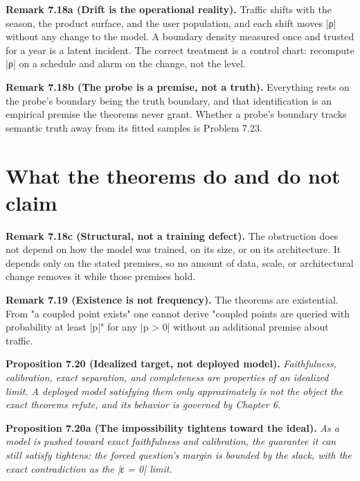 \documentclass{memoir}
\begin{document}
\textbf{Remark 7.18a (Drift is the operational reality).} Traffic shifts with the season, the
product surface, and the user population, and each shift moves \LeanVerb|ρ| without any
change to the model. A boundary density measured once and trusted for a year is
a latent incident. The correct treatment is a control chart: recompute \LeanVerb|ρ| on a
schedule and alarm on the change, not the level.

\textbf{Remark 7.18b (The probe is a premise, not a truth).} Everything rests on the probe's
boundary being the truth boundary, and that identification is an empirical
premise the theorems never grant. Whether a probe's boundary tracks semantic
truth away from its fitted samples is Problem 7.23.



\section{What the theorems do and do not claim}\label{Two--Schemas--of--Impossibility-005F-005F-005F--Machine--Checked--Limits--of--Trustworthy--Machine--Learning-005F-005F-005F--and--Why--They--Tighten--with--Capability----What--It--Means--for--AI--Safety----What--the--theorems--do--and--do--not--claim}

\textbf{Remark 7.18c (Structural, not a training defect).} The obstruction does not depend on
how the model was trained, on its size, or on its architecture. It depends only
on the stated premises, so no amount of data, scale, or architectural change
removes it while those premises hold.

\textbf{Remark 7.19 (Existence is not frequency).} The theorems are existential. From "a
coupled point exists" one cannot derive "coupled points are queried with
probability at least \LeanVerb|p|" for any \LeanVerb|p > 0| without an additional premise about
traffic.

\textbf{Proposition 7.20 (Idealized target, not deployed model).} \emph{Faithfulness, calibration,
exact separation, and completeness are properties of an idealized limit. A
deployed model satisfying them only approximately is not the object the exact
theorems refute, and its behavior is governed by Chapter 6.}

\textbf{Proposition 7.20a (The impossibility tightens toward the ideal).} \emph{As a model is
pushed toward exact faithfulness and calibration, the guarantee it can still
satisfy tightens: the forced question's margin is bounded by the slack, with the
exact contradiction as the \LeanVerb|ε = 0| limit.}
\end{document}
